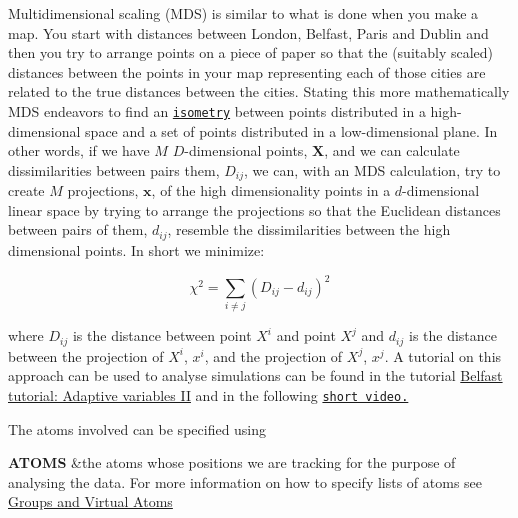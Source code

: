 Multidimensional scaling (M\+D\+S) is similar to what is done when you make a map. You start with distances between London, Belfast, Paris and Dublin and then you try to arrange points on a piece of paper so that the (suitably scaled) distances between the points in your map representing each of those cities are related to the true distances between the cities. Stating this more mathematically M\+D\+S endeavors to find an \href{http://en.wikipedia.org/wiki/Isometry}{\tt isometry} between points distributed in a high-\/dimensional space and a set of points distributed in a low-\/dimensional plane. In other words, if we have $M$ $D$-\/dimensional points, $\mathbf{X}$, and we can calculate dissimilarities between pairs them, $D_{ij}$, we can, with an M\+D\+S calculation, try to create $M$ projections, $\mathbf{x}$, of the high dimensionality points in a $d$-\/dimensional linear space by trying to arrange the projections so that the Euclidean distances between pairs of them, $d_{ij}$, resemble the dissimilarities between the high dimensional points. In short we minimize\+:

\[ \chi^2 = \sum_{i \ne j} \left( D_{ij} - d_{ij} \right)^2 \]

where $D_{ij}$ is the distance between point $X^{i}$ and point $X^{j}$ and $d_{ij}$ is the distance between the projection of $X^{i}$, $x^i$, and the projection of $X^{j}$, $x^j$. A tutorial on this approach can be used to analyse simulations can be found in the tutorial \hyperlink{belfast-3}{Belfast tutorial\+: Adaptive variables I\+I} and in the following \href{https://www.youtube.com/watch?v=ofC2qz0_9_A&feature=youtu.be}{\tt short video.}

\begin{DoxyParagraph}{The atoms involved can be specified using}

\end{DoxyParagraph}
\begin{TabularC}{2}
\hline
{\bfseries  A\+T\+O\+M\+S } &the atoms whose positions we are tracking for the purpose of analysing the data. For more information on how to specify lists of atoms see \hyperlink{Group}{Groups and Virtual Atoms}   \\
\end{TabularC}


